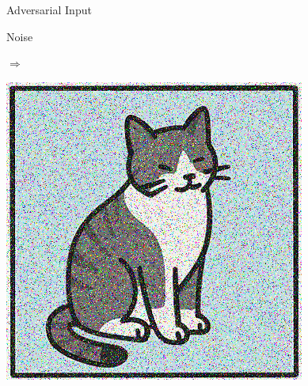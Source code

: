\begin{frame}{Adversarial Input}
\begin{minipage}{0.2\linewidth}
        Noise
    \end{minipage}\hfill
    $\Rightarrow$\hfill
    \begin{minipage}{0.2\linewidth}
        \centering
        \includegraphics[width=\linewidth]{assets/input_cat_noise.png}\\
    \end{minipage}
\end{frame}



